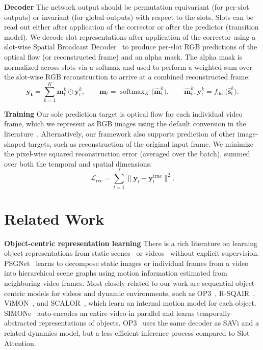 \documentclass{article}
\newcommand{\modelname}{SAVi\xspace}
\newcommand{\lossfun}[1]{\mathcal{L}_\mathit{#1}}
\DeclareMathOperator*{\softmax}{softmax}
\begin{document}
\textbf{Decoder}\quad
The network output should be permutation equivariant (for per-slot outputs) or invariant (for global outputs) with respect to the slots.
Slots can be read out either after application of the corrector or after the predictor (transition model).
We decode slot representations after application of the corrector using a slot-wise Spatial Broadcast Decoder~\citep{watters2019spatial} to produce per-slot RGB predictions of the optical flow (or reconstructed frame) and an alpha mask.
The alpha mask is normalized across slots via a softmax and used to perform a weighted sum over the slot-wise RGB reconstruction to arrive at a combined reconstructed frame:
\begin{equation}
  \bm{y_t} = \sum_{k=1}^K \bm{m}^k_t \odot \bm{y}^k_t,
  \qquad
  \bm{m}_t = \softmax_K \bigl( \bm{\hat{m}}^k_t\bigr),
  \qquad
  \bm{\hat{m}}^k_t, \bm{y}^k_t = f_\text{dec} \bigl(\bm{\hat{s}}^k_t\bigr).
\end{equation}

\textbf{Training}\quad
Our sole prediction target is optical flow for each individual video frame, which we represent as RGB images using the default conversion in the literature~\citep{sun2018pwc}. Alternatively, our framework also supports prediction of other image-shaped targets, such as reconstruction of the original input frame.
We minimize the pixel-wise squared reconstruction error (averaged over the batch), summed over both the temporal and spatial dimensions:
\begin{equation}
\lossfun{\mathrm{rec}} = \sum_{t=1}^T \lVert\bm{y}_{t} - \bm{y}^\text{true}_{t}\rVert^2. 
\end{equation}

\section{Related Work}
\textbf{Object-centric representation learning}\quad
There is a rich literature on learning object representations from static scenes~\citep{greff2016tagger,eslami2016attend,greff2017neural,greff2019multi,burgess2019monet,engelcke2019genesis,crawford2019spatially,lin2020space,locatello2020object,du2021comet} or videos~\citep{van2018relational,kosiorek2018sequential,stelzner2019faster,kipf2019contrastive,crawford2020exploiting,creswell2021unsupervised} without explicit supervision. 
PSGNet~\citep{bear2020learning} learns to decompose static images or individual frames from a video into hierarchical scene graphs using motion information estimated from neighboring video frames.
Most closely related to our work are sequential object-centric models for videos and dynamic environments, such as OP3~\citep{veerapaneni2020entity}, R-SQAIR~\citep{stanic2019r}, ViMON~\citep{weis2020unmasking}, and SCALOR~\citep{jiang2019scalable}, which learn an internal motion model for each object. SIMONe~\citep{kabra2021simone} auto-encodes an entire video in parallel and learns temporally-abstracted representations of objects.
OP3~\citep{veerapaneni2020entity} uses the same decoder as \modelname and a related dynamics model, but a less efficient inference process compared to Slot Attention.
 
\end{document}

